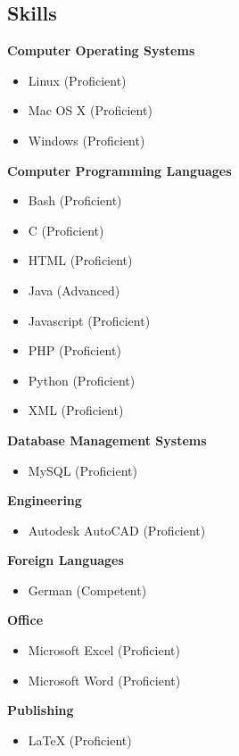 \documentclass{res}
\begin{document}
\begin{resume}
\section{Skills}          
    \textbf{Computer Operating Systems}
        \begin{itemize}
 	        \item Linux (Proficient)
            \item Mac OS X (Proficient)
            \item Windows (Proficient)
        \end{itemize}
    \textbf{Computer Programming Languages}
        \begin{itemize}
            \item Bash (Proficient)
            \item C (Proficient)
            \item HTML (Proficient)
 	        \item Java (Advanced)
            \item Javascript (Proficient)
            \item PHP (Proficient)
 	        \item Python (Proficient)
            \item XML (Proficient)
        \end{itemize}
    \textbf{Database Management Systems}
        \begin{itemize}
 	        \item MySQL (Proficient)
        \end{itemize}
    \textbf{Engineering}
        \begin{itemize}
 	        \item Autodesk AutoCAD (Proficient)
        \end{itemize}
    \textbf{Foreign Languages}
        \begin{itemize}
 	        \item German (Competent)
        \end{itemize}
    \textbf{Office}
        \begin{itemize}
            \item Microsoft Excel (Proficient)
 	        \item Microsoft Word (Proficient)
        \end{itemize}
    \textbf{Publishing}
        \begin{itemize}
 	        \item \LaTeX{} (Proficient)
        \end{itemize}


\end{resume}
\end{document}
